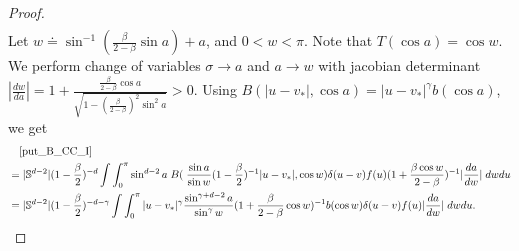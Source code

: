 \documentclass[reqno,10pt]{amsart}
\numberwithin{equation}{section}
\begin{document}
\begin{proof}
\begin{align}
\end{align}
\noindent Let $w \doteq\sin^{-1}(\frac{\beta}{2-\beta}\sin a)+a$, and $0 < w < \pi.$ Note that $T(\cos a) = \cos w.$
We perform change of variables $\sigma \rightarrow a$ and $a \rightarrow w$ with jacobian determinant $|\frac{dw}{da}| = 1+\frac{\frac{\beta}{2-\beta}\cos a}{\sqrt{1-(\frac{\beta}{2-\beta})^{2}\sin^{2}a}}>0$. Using 
$B(|u-v_*|, \cos a)=|u-v_*|^\gamma b(\cos a)$, we get 
\begin{align}
    &\quad \eqref{put_B_CC_I} \notag \\ 
    &=|\mathbb{S}^{d-2}|(1-\frac{\beta}{2})^{-d}\int \int_0^\pi \sin^{d-2}a\;B(\;\frac{\sin a}{\sin w}(1-\frac{\beta}{2})^{-1}|u-v_*|,\cos w)
    \delta(u-v)f(u)(1+\frac{\beta \cos w}{2-\beta})^{-1}|\frac{da}{dw}|\; dwdu \notag \\
    &=|\mathbb{S}^{d-2}|(1-\frac{\beta}{2})^{-d-\gamma}\int \int_0^\pi |u-v_*|^{\gamma} \frac{\sin^{\gamma+d-2}a}{\sin^{\gamma}w}(1+\frac{\beta}{2-\beta}\cos w)^{-1}b(\cos w) \delta(u-v)f(u)|\frac{da}{dw}| \; dwdu. \label{before_sim_CC_I} 
\end{align} \vspace{2mm}


\end{proof}
\end{document}
